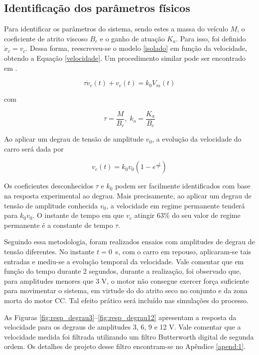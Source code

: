 \subsection{Identificação dos parâmetros físicos}
\label{identificacao}
Para identificar os parâmetros do sistema, sendo estes a massa do veículo $M$, o coeficiente de atrito viscoso $B_c$ e o ganho de atuação $K_a$. Para isso, foi definido $\dot{x}_c=v_c$. Dessa forma, reescreveu-se o modelo \eqref{isolado} em função da velocidade, obtendo a Equação \eqref{velocidade}. Um procedimento similar pode ser encontrado em .

\begin{equation}
    \tau\dot{v}_c(t)+v_c(t)=k_0V_m(t)
    \label{velocidade}
\end{equation}

\noindent com

\begin{equation}
    \tau=\frac{M}{B_c},\;k_o=\frac{K_a}{B_c}
    \label{velocidade_parametros}
\end{equation}

Ao aplicar um degrau de tensão de amplitude $v_0$, a evolução da velocidade do carro será dada por \cite{ogata2010engenharia} 

\begin{equation}
    v_c(t)=k_0v_0(1-e^\frac{-t}{\tau})
    \label{equacao_ordem1}
\end{equation}

Os coeficientes desconhecidos $\tau$ e $k_0$ podem ser facilmente identificados com base na resposta experimental ao degrau. Mais precisamente, ao aplicar um degrau de tensão de amplitude conhecida $v_0$, a velocidade em regime permanente tenderá para $k_0v_0$.
O instante de tempo em que $v_c$ atingir 63\% do seu valor de regime permanente é a constante de tempo $\tau$.

Seguindo essa metodologia, foram realizados ensaios com amplitudes de degrau de tensão diferentes. No instante $t = 0$~s, com o carro em repouso, aplicaram-se tais entradas e mediu-se a evolução temporal da velocidade. Vale comentar que em função do tempo durante 2 segundos, durante a realização, foi observado que, para amplitudes menores que 3 V, o motor não consegue exercer força suficiente para movimentar o sistema, em virtude do do atrito seco no conjunto e da zona morta do motor CC. Tal efeito prático será incluído nas simulações do processo. 

As Figuras \ref{fig:resp_degrau3}--\ref{fig:resp_degrau12} apresentam a resposta da velocidade para os degraus de amplitudes 3, 6, 9 e 12 V. Vale comentar que a velocidade medida foi filtrada utilizando um filtro Butterworth digital de segunda ordem. Os detalhes de projeto desse filtro encontram-se no Apêndice \ref{apend:1}.

